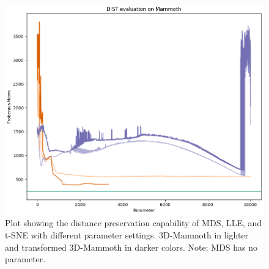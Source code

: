 \begin{figure}[!]
	\centering
	\includegraphics[width=1\columnwidth]{images/DIST_transMammoth_all_B_and_A.png}
	\caption[Transformed 3D-Mammoth Distance Preservation]{Plot showing the distance preservation capability of MDS, LLE, and t-SNE with different parameter settings. 3D-Mammoth in lighter and transformed 3D-Mammoth in darker colors. Note: MDS has no parameter.}
    \label{fig:DIST_transMammoth_all_B_and_A}
\end{figure}

